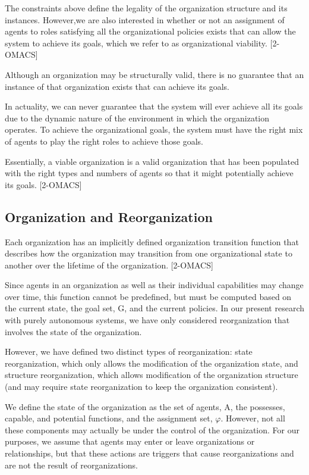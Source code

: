 The constraints above define the legality of the organization structure and its instances.  However,we are also interested in whether or not an assignment of agents to roles satisfying all the organizational policies exists that can allow the system to achieve its goals, which we refer to as organizational viability. [2-OMACS]

Although an organization may be structurally valid, there is no guarantee that an instance of that organization exists that can achieve its goals. 

In actuality, we can never guarantee that the system will ever achieve all its goals due to the dynamic nature of the environment in which the organization operates. To achieve the organizational goals, the system must have the right mix of agents to play the right roles to achieve those goals. 

Essentially, a viable organization is a valid organization that has been populated with the right types and numbers of agents so that it might potentially achieve its goals. [2-OMACS]

\subsection{ Organization and Reorganization }
Each organization has an implicitly defined organization transition function 
that describes how the organization may transition from one organizational state 
to another over the lifetime of the organization.  [2-OMACS]
	
Since agents in an organization as well as their individual capabilities may change over time, 
this function cannot be predefined, but must be computed based on the current state, 
the goal set, G, and the current policies. In our present research with purely autonomous systems, we have only considered reorganization that involves the state of the organization. 

However, we have defined two distinct types of reorganization: state reorganization, which only allows the modification of the organization state, and structure reorganization, which allows modification  of the organization structure (and may require state reorganization to keep the organization consistent).

We define the state of the organization as the set of agents, A, the possesses, capable, and potential functions, and the assignment set, $\varphi$. However, not all these components may actually be under the control of the organization. For our purposes, we assume that agents may enter or leave organizations or relationships, but that these actions are triggers that cause reorganizations and are not the result of reorganizations. 

